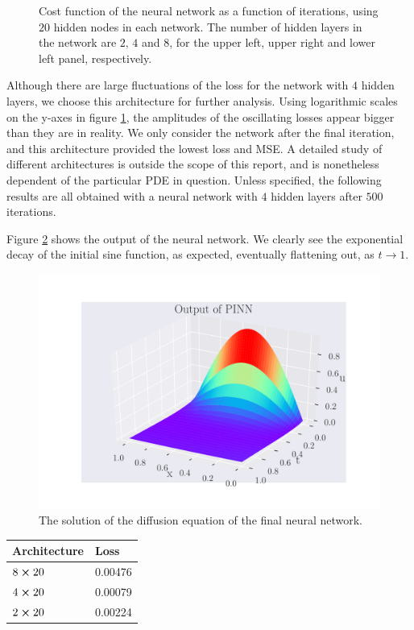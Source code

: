 \documentclass[12pt]{extarticle}
\begin{document}
\begin{figure}[h]
	\endminipage\hfill
	\caption{Cost function of the neural network as a function of iterations, using $20$ hidden nodes in each network. The number of hidden layers in the network are $2,\,4$ and $8$, for the upper left, upper right and lower left panel, respectively.} \label{fig:Error_NN_architecture}
	\endminipage
\end{figure}

Although there are large fluctuations of the loss for the network with $4$ hidden layers, we choose this architecture for further analysis. Using logarithmic scales on the y-axes in figure \ref{fig:Error_NN_architecture}, the amplitudes of the oscillating losses appear bigger than they are in reality. We only consider the network after the final iteration, and this architecture provided the lowest loss and MSE. A detailed study of different architectures is outside the scope of this report, and is nonetheless dependent of the particular PDE in question. Unless specified, the following results are all obtained with a neural network with $4$ hidden layers after $500$ iterations. 

Figure \ref{fig:NN_architecture_solution} shows the output of the neural network. We clearly see the exponential decay of the initial sine function, as expected, eventually flattening out, as $t\to1$.   
\begin{figure}[h]
	\centering
	\includegraphics[width=\linewidth]{../output/plots/NN_diffusion_solution_Nn20_Nh4.pdf}
	\caption{The solution of the diffusion equation of the final neural network.} \label{fig:NN_architecture_solution}
\end{figure}

\begin{table}[h]
	\begin{tabular}{|l|l|}
		\hline
		Architecture & Loss   \\ \hline
		$8\cross20$         & 0.00476 \\ \hline
		$4\cross20$         & 0.00079 \\ \hline
		$2\cross20$         & 0.00224 \\ \hline
	\end{tabular}
\end{table}
\end{document}
